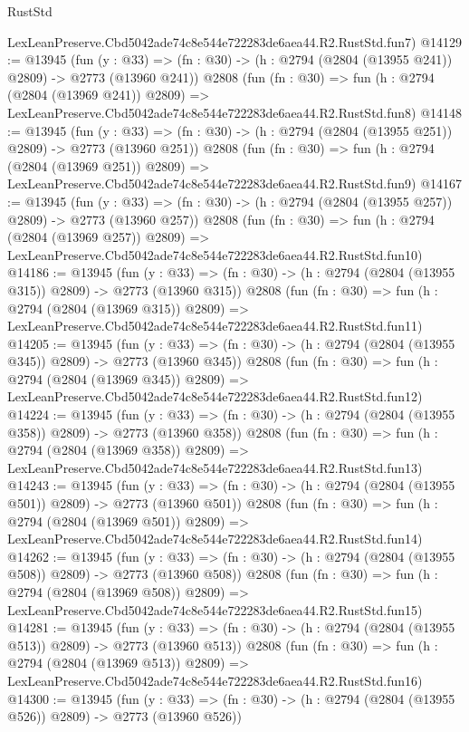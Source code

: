 \begin{lexlean}{RustStd}
\begin{coremodule}
    LexLeanPreserve.Cbd5042ade74c8e544e722283de6aea44.R2.RustStd.fun7)
@14129 := @13945
    (fun (y : @33) => (fn : @30) -> (h : @2794 (@2804 (@13955 @241)) @2809) -> @2773 (@13960 @241))
    @2808
    (fun (fn : @30) =>
    fun (h : @2794 (@2804 (@13969 @241)) @2809) =>
    LexLeanPreserve.Cbd5042ade74c8e544e722283de6aea44.R2.RustStd.fun8)
@14148 := @13945
    (fun (y : @33) => (fn : @30) -> (h : @2794 (@2804 (@13955 @251)) @2809) -> @2773 (@13960 @251))
    @2808
    (fun (fn : @30) =>
    fun (h : @2794 (@2804 (@13969 @251)) @2809) =>
    LexLeanPreserve.Cbd5042ade74c8e544e722283de6aea44.R2.RustStd.fun9)
@14167 := @13945
    (fun (y : @33) => (fn : @30) -> (h : @2794 (@2804 (@13955 @257)) @2809) -> @2773 (@13960 @257))
    @2808
    (fun (fn : @30) =>
    fun (h : @2794 (@2804 (@13969 @257)) @2809) =>
    LexLeanPreserve.Cbd5042ade74c8e544e722283de6aea44.R2.RustStd.fun10)
@14186 := @13945
    (fun (y : @33) => (fn : @30) -> (h : @2794 (@2804 (@13955 @315)) @2809) -> @2773 (@13960 @315))
    @2808
    (fun (fn : @30) =>
    fun (h : @2794 (@2804 (@13969 @315)) @2809) =>
    LexLeanPreserve.Cbd5042ade74c8e544e722283de6aea44.R2.RustStd.fun11)
@14205 := @13945
    (fun (y : @33) => (fn : @30) -> (h : @2794 (@2804 (@13955 @345)) @2809) -> @2773 (@13960 @345))
    @2808
    (fun (fn : @30) =>
    fun (h : @2794 (@2804 (@13969 @345)) @2809) =>
    LexLeanPreserve.Cbd5042ade74c8e544e722283de6aea44.R2.RustStd.fun12)
@14224 := @13945
    (fun (y : @33) => (fn : @30) -> (h : @2794 (@2804 (@13955 @358)) @2809) -> @2773 (@13960 @358))
    @2808
    (fun (fn : @30) =>
    fun (h : @2794 (@2804 (@13969 @358)) @2809) =>
    LexLeanPreserve.Cbd5042ade74c8e544e722283de6aea44.R2.RustStd.fun13)
@14243 := @13945
    (fun (y : @33) => (fn : @30) -> (h : @2794 (@2804 (@13955 @501)) @2809) -> @2773 (@13960 @501))
    @2808
    (fun (fn : @30) =>
    fun (h : @2794 (@2804 (@13969 @501)) @2809) =>
    LexLeanPreserve.Cbd5042ade74c8e544e722283de6aea44.R2.RustStd.fun14)
@14262 := @13945
    (fun (y : @33) => (fn : @30) -> (h : @2794 (@2804 (@13955 @508)) @2809) -> @2773 (@13960 @508))
    @2808
    (fun (fn : @30) =>
    fun (h : @2794 (@2804 (@13969 @508)) @2809) =>
    LexLeanPreserve.Cbd5042ade74c8e544e722283de6aea44.R2.RustStd.fun15)
@14281 := @13945
    (fun (y : @33) => (fn : @30) -> (h : @2794 (@2804 (@13955 @513)) @2809) -> @2773 (@13960 @513))
    @2808
    (fun (fn : @30) =>
    fun (h : @2794 (@2804 (@13969 @513)) @2809) =>
    LexLeanPreserve.Cbd5042ade74c8e544e722283de6aea44.R2.RustStd.fun16)
@14300 := @13945
    (fun (y : @33) => (fn : @30) -> (h : @2794 (@2804 (@13955 @526)) @2809) -> @2773 (@13960 @526))

\end{coremodule}
\end{lexlean}
